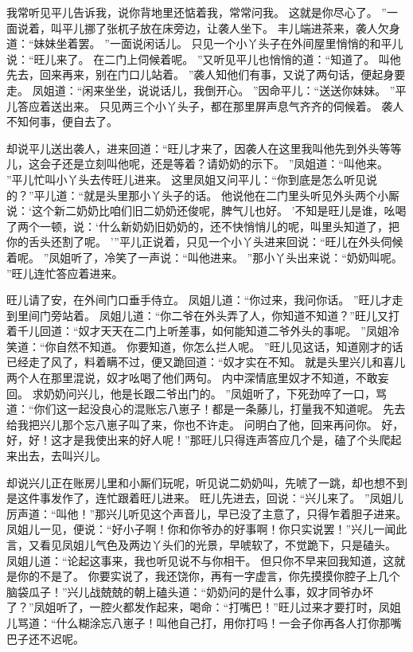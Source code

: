 我常听见平儿告诉我，说你背地里还惦着我，常常问我。
这就是你尽心了。
”一面说着，叫平儿挪了张杌子放在床旁边，让袭人坐下。
丰儿端进茶来，袭人欠身道：“妹妹坐着罢。
”一面说闲话儿。
只见一个小丫头子在外间屋里悄悄的和平儿说：“旺儿来了。
在二门上伺候着呢。
”又听见平儿也悄悄的道：“知道了。
叫他先去，回来再来，别在门口儿站着。
”袭人知他们有事，又说了两句话，便起身要走。
凤姐道：“闲来坐坐，说说话儿，我倒开心。
”因命平儿：“送送你妹妹。
”平儿答应着送出来。
只见两三个小丫头子，都在那里屏声息气齐齐的伺候着。
袭人不知何事，便自去了。
\par
却说平儿送出袭人，进来回道：“旺儿才来了，因袭人在这里我叫他先到外头等等儿，这会子还是立刻叫他呢，还是等着？请奶奶的示下。
”凤姐道：“叫他来。
”平儿忙叫小丫头去传旺儿进来。
这里凤姐又问平儿：“你到底是怎么听见说的？”平儿道：“就是头里那小丫头子的话。
他说他在二门里头听见外头两个小厮说：‘这个新二奶奶比咱们旧二奶奶还俊呢，脾气儿也好。
’不知是旺儿是谁，吆喝了两个一顿，说：‘什么新奶奶旧奶奶的，还不快悄悄儿的呢，叫里头知道了，把你的舌头还割了呢。
’”平儿正说着，只见一个小丫头进来回说：“旺儿在外头伺候着呢。
”凤姐听了，冷笑了一声说：“叫他进来。
”那小丫头出来说：“奶奶叫呢。
”旺儿连忙答应着进来。
\par
旺儿请了安，在外间门口垂手侍立。
凤姐儿道：“你过来，我问你话。
”旺儿才走到里间门旁站着。
凤姐儿道：“你二爷在外头弄了人，你知道不知道？”旺儿又打着千儿回道：“奴才天天在二门上听差事，如何能知道二爷外头的事呢。
”凤姐冷笑道：“你自然不知道。
你要知道，你怎么拦人呢。
”旺儿见这话，知道刚才的话已经走了风了，料着瞒不过，便又跪回道：“奴才实在不知。
就是头里兴儿和喜儿两个人在那里混说，奴才吆喝了他们两句。
内中深情底里奴才不知道，不敢妄回。
求奶奶问兴儿，他是长跟二爷出门的。
”凤姐听了，下死劲啐了一口，骂道：“你们这一起没良心的混账忘八崽子！都是一条藤儿，打量我不知道呢。
先去给我把兴儿那个忘八崽子叫了来，你也不许走。
问明白了他，回来再问你。
好，好，好！这才是我使出来的好人呢！”那旺儿只得连声答应几个是，磕了个头爬起来出去，去叫兴儿。
\par
却说兴儿正在账房儿里和小厮们玩呢，听见说二奶奶叫，先唬了一跳，却也想不到是这件事发作了，连忙跟着旺儿进来。
旺儿先进去，回说：“兴儿来了。
”凤姐儿厉声道：“叫他！”那兴儿听见这个声音儿，早已没了主意了，只得乍着胆子进来。
凤姐儿一见，便说：“好小子啊！你和你爷办的好事啊！你只实说罢！”兴儿一闻此言，又看见凤姐儿气色及两边丫头们的光景，早唬软了，不觉跪下，只是磕头。
凤姐儿道：“论起这事来，我也听见说不与你相干。
但只你不早来回我知道，这就是你的不是了。
你要实说了，我还饶你，再有一字虚言，你先摸摸你腔子上几个脑袋瓜子！”兴儿战兢兢的朝上磕头道：“奶奶问的是什么事，奴才同爷办坏了？”凤姐听了，一腔火都发作起来，喝命：“打嘴巴！”旺儿过来才要打时，凤姐儿骂道：“什么糊涂忘八崽子！叫他自己打，用你打吗！一会子你再各人打你那嘴巴子还不迟呢。
